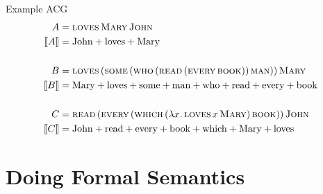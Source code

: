 \documentclass{beamer}
\begin{document}
\begin{frame}{Example ACG}
  \begin{align*}
  A &= \textsc{loves}\,\textsc{Mary}\,\textsc{John} \\
  \llbracket A \rrbracket &= \mathrm{John} + \mathrm{loves} + \mathrm{Mary} \\
  \\
  B &= \textsc{loves}\,(\textsc{some}\,(\textsc{who}\,(\textsc{read}\,(\textsc{every}\,\textsc{book}))\,\textsc{man}))\,\textsc{Mary} \\
  \llbracket B \rrbracket &= \mathrm{Mary} + \mathrm{loves} + \mathrm{some} + \mathrm{man} + \mathrm{who} + \mathrm{read} + \mathrm{every} + \mathrm{book} \\
  \\
  C &= \textsc{read}\,(\textsc{every}\,(\textsc{which}\,(\lambda x.\, \textsc{loves}\,x\,\textsc{Mary})\,\textsc{book}))\,\textsc{John} \\
  \llbracket C \rrbracket &= \mathrm{John} + \mathrm{read} + \mathrm{every} + \mathrm{book} + \mathrm{which} + \mathrm{Mary} + \mathrm{loves} \\
  \end{align*}
\end{frame}



\section{Doing Formal Semantics}
\end{document}
